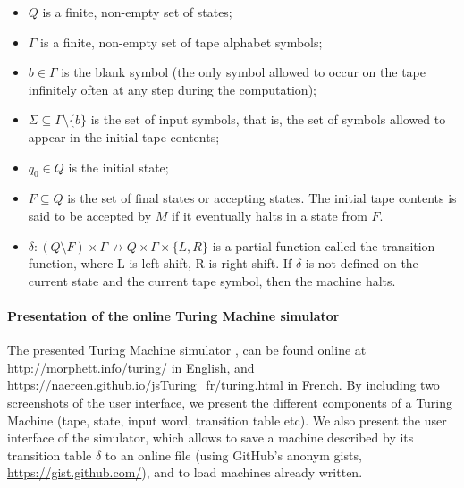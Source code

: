 \documentclass[runningheads]{llncs}
\begin{document}
\begin{small}
\begin{itemize}
    \item
    $Q$ is a finite, non-empty set of states;
    \item
    $\Gamma$ is a finite, non-empty set of tape alphabet symbols;
    \item
    $b\in \Gamma$ is the blank symbol (the only symbol allowed to occur on the tape infinitely often at any step during the computation);
    \item
    $\Sigma \subseteq \Gamma \setminus \{b\}$ is the set of input symbols, that is, the set of symbols allowed to appear in the initial tape contents;
    \item
    $q_{0}\in Q$ is the initial state;
    \item
    $F\subseteq Q$ is the set of final states or accepting states. The initial tape contents is said to be accepted by $M$ if it eventually halts in a state from $F$.
    \item
    $\delta :(Q\setminus F)\times \Gamma \not \to Q\times \Gamma \times \{L,R\}$ is a partial function called the transition function, where L is left shift, R is right shift. If $\delta$ is not defined on the current state and the current tape symbol, then the machine halts.
\end{itemize}
\end{small}


\paragraph{Presentation of the online Turing Machine simulator}

The presented Turing Machine simulator \cite{morphett_simulators,naereen_simulators},
can be found online at
\url{http://morphett.info/turing/} in English,
and \url{https://naereen.github.io/jsTuring_fr/turing.html} in French.
%
By including two screenshots of the user interface, we present the different components of a Turing Machine (tape, state, input word, transition table etc).
We also present the user interface of the simulator, which allows to save a machine described by its transition table $\delta$ to an online file (using GitHub's anonym gists, \url{https://gist.github.com/}), and to load machines already written.
\end{document}
